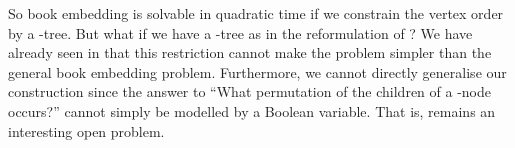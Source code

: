 So book embedding is solvable in quadratic time if we constrain the vertex order by a \Q-tree. But what if we have a \PT-tree as in the
reformulation of \SEFECON? We have already seen in  that this
restriction cannot make the problem simpler than the general book embedding problem. Furthermore, we cannot directly generalise our construction since the answer to ``What permutation of the children of a \PT-node occurs?'' cannot simply be modelled by a Boolean variable.
That is, \probPTree remains an
interesting open problem.
